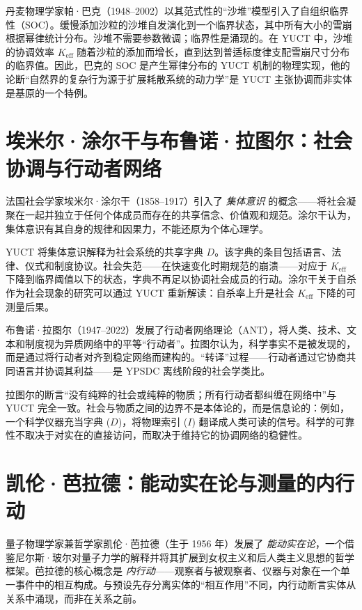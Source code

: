 \documentclass[12pt,a4paper]{article}
\begin{document}
	丹麦物理学家帕·巴克（1948–2002）以其范式性的“沙堆”模型引入了自组织临界性（SOC）。缓慢添加沙粒的沙堆自发演化到一个临界状态，其中所有大小的雪崩根据幂律统计分布。沙堆不需要参数微调；临界性是涌现的。在 YUCT 中，沙堆的协调效率 \(K_{\mathrm{eff}}\) 随着沙粒的添加而增长，直到达到普适标度律支配雪崩尺寸分布的临界值。因此，巴克的 SOC 是产生幂律分布的 YUCT 机制的物理实现，他的论断“自然界的复杂行为源于扩展耗散系统的动力学”是 YUCT 主张协调而非实体是基原的一个特例。
	
	\section{埃米尔·涂尔干与布鲁诺·拉图尔：社会协调与行动者网络}
	
	法国社会学家埃米尔·涂尔干（1858–1917）引入了 \emph{集体意识} 的概念——将社会凝聚在一起并独立于任何个体成员而存在的共享信念、价值观和规范。涂尔干认为，集体意识有其自身的规律和因果力，不能还原为个体心理学。
	
	YUCT 将集体意识解释为社会系统的共享字典 \(D\)。该字典的条目包括语言、法律、仪式和制度协议。社会失范——在快速变化时期规范的崩溃——对应于 \(K_{\mathrm{eff}}\) 下降到临界阈值以下的状态，字典不再足以协调社会成员的行动。涂尔干关于自杀作为社会现象的研究可以通过 YUCT 重新解读：自杀率上升是社会 \(K_{\mathrm{eff}}\) 下降的可测量后果。
	
	布鲁诺·拉图尔（1947–2022）发展了行动者网络理论（ANT），将人类、技术、文本和制度视为异质网络中的平等“行动者”。拉图尔认为，科学事实不是被发现的，而是通过将行动者对齐到稳定网络而建构的。“转译”过程——行动者通过它协商共同语言并协调其利益——是 YPSDC 离线阶段的社会学类比。
	
	拉图尔的断言“没有纯粹的社会或纯粹的物质；所有行动者都纠缠在网络中”与 YUCT 完全一致。社会与物质之间的边界不是本体论的，而是信息论的：例如，一个科学仪器充当字典 (\(D\))，将物理索引 (\(I\)) 翻译成人类可读的信号。科学的可靠性不取决于对实在的直接访问，而取决于维持它的协调网络的稳健性。
	
	\section{凯伦·芭拉德：能动实在论与测量的内行动}
	
	量子物理学家兼哲学家凯伦·芭拉德（生于 1956 年）发展了 \emph{能动实在论}，一个借鉴尼尔斯·玻尔对量子力学的解释并将其扩展到女权主义和后人类主义思想的哲学框架。芭拉德的核心概念是 \emph{内行动}——观察者与被观察者、仪器与对象在一个单一事件中的相互构成。与预设先存分离实体的“相互作用”不同，内行动断言实体从关系中涌现，而非在关系之前。
	
\end{document}
